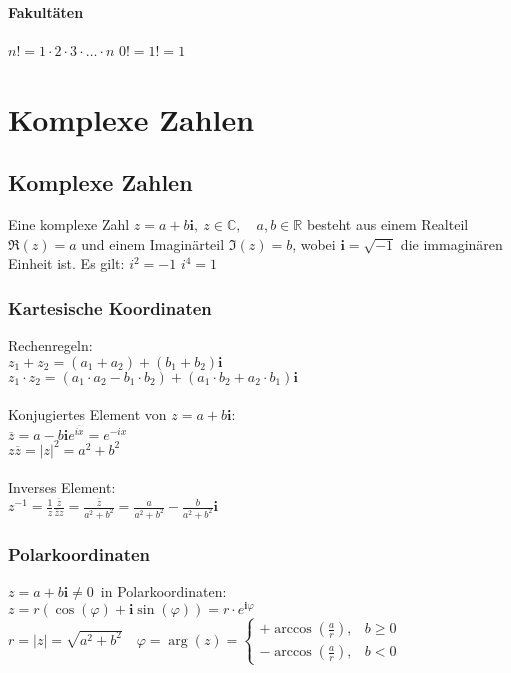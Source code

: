 \documentclass[german]{latex4ei/latex4ei_sheet}
\begin{document}
\begin{sectionbox}
\paragraph{Fakultäten} %
\label{par:fakultaeten}
$n! = 1 \cdot 2 \cdot 3 \cdot \ldots \cdot n$ \qquad  $0! = 1! = 1$



\end{sectionbox}




\section{Komplexe Zahlen}
\begin{sectionbox}
    \subsection{Komplexe Zahlen}
    Eine komplexe Zahl $z=a+b\mathbf{i},\ z\in \mathbb C, \quad a,b \in \mathbb R$ besteht aus einem Realteil $\Re(z)=a$ und einem Imaginärteil $\Im(z)=b$, wobei $\mathbf{i}=\sqrt{-1}$ die immaginären Einheit ist.
    Es gilt: \quad $i^2 = -1$ \quad $i^4 = 1$
    \subsubsection{Kartesische Koordinaten}
    Rechenregeln:\\
    $z_1+z_2=(a_1+a_2)+(b_1+b_2)\mathbf{i}$\\
    $z_1\cdot z_2=(a_1\cdot a_2-b_1\cdot b_2)+(a_1\cdot b_2+a_2\cdot b_1)\mathbf{i}$\\
    \\
    Konjugiertes Element von $z=a+b\mathbf{i}$:\\
    $\overline{z}=a-b\mathbf{i}$\qquad \qquad \qquad \qquad \qquad \qquad \qquad \qquad $e^{\overline{ix}} = e^{-ix}$  \\
    $z\overline{z}=|z|^2=a^2+b^2$\\
    \\
    Inverses Element:\\
    $z^{-1}=\frac{1}{z}\frac{\overline z}{\overline z z}=\frac{\overline z}{a^2+b^2}=\frac{a}{a^2+b^2} - \frac{b}{a^2+b^2}\mathbf{i}$
    
    
    \subsubsection{Polarkoordinaten}
    $z=a+b\mathbf{i}\ne0$\ in Polarkoordinaten:\\
    $z=r (\cos(\varphi)+\mathbf{i}\sin(\varphi))=r\cdot e^{\mathbf{i} \varphi}$\\
    $r=|z|=\sqrt{a^2+b^2}\quad\varphi=\arg(z)=\begin{cases}+\arccos \left( \frac{a}{r}\right),  & b\ge0   \\  -\arccos \left( \frac{a}{r}\right), & b<0\end{cases}$
    

\end{sectionbox}
\end{document}
